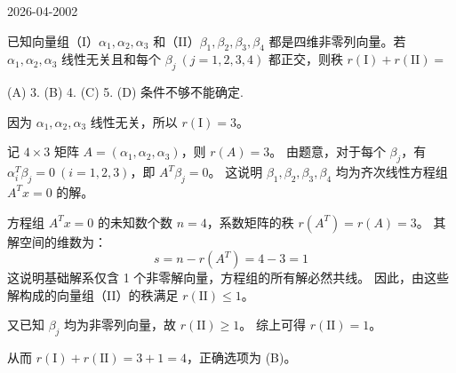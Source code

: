 \begin{mistake}{2026-04-20}{02}

\begin{problemcontent}
已知向量组（I）\(\alpha_1, \alpha_2, \alpha_3\) 和（II）\(\beta_1, \beta_2, \beta_3, \beta_4\) 都是四维非零列向量。若 \(\alpha_1, \alpha_2, \alpha_3\) 线性无关且和每个 \(\beta_j\ (j=1,2,3,4)\) 都正交，则秩 \(r(\mathrm{I}) + r(\mathrm{II}) =\)

(A) 3. \qquad (B) 4. \qquad (C) 5. \qquad (D) 条件不够不能确定.
\end{problemcontent}

\begin{solutioncontent}
因为 \(\alpha_1, \alpha_2, \alpha_3\) 线性无关，所以 \(r(\mathrm{I}) = 3\)。

记 \(4 \times 3\) 矩阵 \(A = (\alpha_1, \alpha_2, \alpha_3)\)，则 \(r(A)=3\)。
由题意，对于每个 \(\beta_j\)，有 \(\alpha_i^T \beta_j = 0\ (i=1,2,3)\)，即 \(A^T \beta_j = 0\)。
这说明 \(\beta_1, \beta_2, \beta_3, \beta_4\) 均为齐次线性方程组 \(A^T x = 0\) 的解。

方程组 \(A^T x = 0\) 的未知数个数 \(n=4\)，系数矩阵的秩 \(r(A^T) = r(A) = 3\)。
其解空间的维数为：
\[
 s = n - r(A^T) = 4 - 3 = 1
\]
这说明基础解系仅含 1 个非零解向量，方程组的所有解必然共线。
因此，由这些解构成的向量组（II）的秩满足 \(r(\mathrm{II}) \le 1\)。

又已知 \(\beta_j\) 均为非零列向量，故 \(r(\mathrm{II}) \ge 1\)。
综上可得 \(r(\mathrm{II}) = 1\)。

从而 \(r(\mathrm{I}) + r(\mathrm{II}) = 3 + 1 = 4\)，正确选项为 (B)。
\end{solutioncontent}


\end{mistake}
